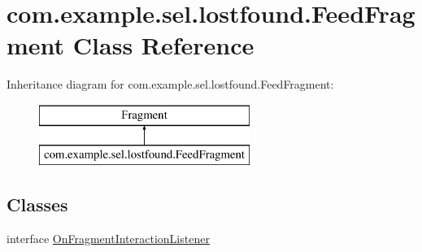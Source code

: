 \hypertarget{classcom_1_1example_1_1sel_1_1lostfound_1_1FeedFragment}{}\section{com.\+example.\+sel.\+lostfound.\+Feed\+Fragment Class Reference}
\label{classcom_1_1example_1_1sel_1_1lostfound_1_1FeedFragment}
Inheritance diagram for com.\+example.\+sel.\+lostfound.\+Feed\+Fragment\+:\begin{figure}[H]
\begin{center}
\leavevmode
\includegraphics[height=2.000000cm]{classcom_1_1example_1_1sel_1_1lostfound_1_1FeedFragment}
\end{center}
\end{figure}
\subsection*{Classes}
\begin{DoxyCompactItemize}
\item 
interface \hyperlink{interfacecom_1_1example_1_1sel_1_1lostfound_1_1FeedFragment_1_1OnFragmentInteractionListener}{On\+Fragment\+Interaction\+Listener}
\end{DoxyCompactItemize}
